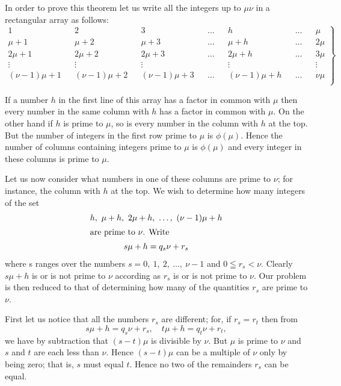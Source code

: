 \documentclass[oneside]{book}
\begin{document}
In order to prove this theorem let us write all the integers up to
$\mu\nu$ in a rectangular array as follows:
\footnotesize\begin{equation}
 \left .
 \begin{aligned}
                 1 &&                2 &&                3 &&
  \ldots &&                h && \ldots &&  \mu \\
           \mu + 1 &&          \mu + 2 &&          \mu + 3 &&
  \ldots &&          \mu + h && \ldots && 2\mu \\
         2 \mu + 1 &&        2 \mu + 2 &&        2 \mu + 3 &&
  \ldots &&        2 \mu + h && \ldots && 3\mu \\
            \vdots &&           \vdots &&           \vdots &&
         &&           \vdots &&        && \vdots \\
  (\nu - 1)\mu + 1 && (\nu - 1)\mu + 2 && (\nu - 1)\mu + 3 &&
  \ldots && (\nu - 1)\mu + h && \ldots && \nu\mu \\
 \end{aligned}
 \right \} \tag{A}
\end{equation}\normalsize

If a number $h$ in the first line of this array has a factor in
common with $\mu$ then every number in the same column with $h$ has
a factor in common with $\mu$. On the other hand if $h$ is prime to
$\mu$, so is every number in the column with $h$ at the top. But the
number of integers in the first row prime to $\mu$ is $\phi(\mu)$.
Hence the number of columns containing integers prime to $\mu$ is
$\phi(\mu)$ and every integer in these columns is prime to $\mu$.

Let us now consider what numbers in one of these columns are prime
to $\nu$; for instance, the column with $h$ at the top. We wish to
determine how many integers of the set
\begin{gather*}
h,\ \mu + h,\ 2\mu + h,\ \ldots,\ (\nu - 1)\mu + h \\
\intertext{are prime to $\nu$. Write}
s\mu + h = q_s\nu + r_s
\end{gather*} where s ranges over the numbers $s = 0,\ 1,\ 2,\
\ldots,\ \nu - 1$ and $0\leqq r_s < \nu$. Clearly $s\mu + h$ is or
is not prime to $\nu$ according as $r_s$ is or is not prime to
$\nu$. Our problem is then reduced to that of determining how many
of the quantities $r_s$ are prime to $\nu$.

First let us notice that all the numbers $r_s$ are different; for,
if $r_s = r_t$ then from
\begin{equation*}
s\mu + h = q_s\nu + r_s,\quad t\mu + h = q_t\nu + r_t,
\end{equation*}
we have by subtraction that $(s-t)\mu$ is divisible by $\nu$. But
$\mu$ is prime to $\nu$ and $s$ and $t$ are each less than $\nu$.
Hence $(s-t)\mu$ can be a multiple of $\nu$ only by being zero; that
is, $s$ must equal $t$. Hence no two of the remainders $r_s$ can be
equal.
\end{document}
